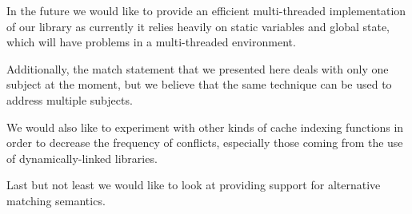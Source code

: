 
In the future we would like to provide an efficient multi-threaded 
implementation of our library as currently it relies heavily on static variables 
and global state, which will have problems in a multi-threaded environment. 

Additionally, the match statement that we presented here deals with only one 
subject at the moment, but we believe that the same technique can be used to 
address multiple subjects.

We would also like to experiment with other kinds of cache indexing functions in 
order to decrease the frequency of conflicts, especially those coming from the use 
of dynamically-linked libraries.

Last but not least we would like to look at providing support for alternative 
matching semantics.
